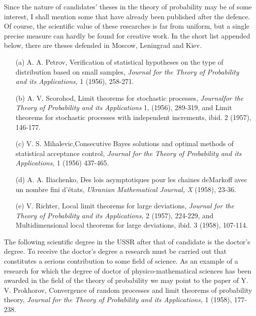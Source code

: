 Since the nature of candidates' theses in the theory of probability
may be of some interest, I shall mention some that have already been
published after the defence. Of course, the scientific value of these
researches is far from uniform, but a single precise measure can
hardly be found for creative work. In the short list appended below,
there are theses defended in Moscow, Leningrad and Kiev. 
\begin{itemize}
\item[(a)] A. A. Petrov, Verification of statistical hypotheses on the
  type of distribution based on small samples, \textit{Journal for the
  Theory of Probability and its Applications,}  1 (1956), 258-271.

\item[(b)] A. V. Scorohod, Limit theorems for stochastic processes,
  \textit{Journal\break for the Theory of Probability and its Applications} 1,
  (1956), 289-319, and Limit theorems for stochastic processes with
  independent increments, ibid. 2 (1957), 146-177.

\item[(c)] V. S. Mihalevic,\pageoriginale Consecutive Bayes solutions
  and optimal methods of statistical acceptance control,
  \textit{Journal for the Theory of Probability and its Applications,}
  1 (1956) 437-465.

\item[(d)] A. A. Iliachenko, Des lois asymptotiques pour les chaines
  de\break Markoff avec un nombre fini d'\'etats, \textit{Ukranian
    Mathematical Journal, X} (1958), 23-36.

\item[(e)] V. Richter, Local limit theorems for large deviations,
  \textit{Journal for the Theory of Probability and its Applications,}
  2 (1957), 224-229, and Multidimensional local theorems for large
  deviations, ibid. 3 (1958), 107-114.
\end{itemize}

The following scientific degree in the USSR after that of candidate is
the doctor's degree. To receive the doctor's degree a research must be
carried out that constitutes a serious contribution to some field of
science. As an example of a research for which the degree of doctor of
physico-mathematical sciences has been awarded in the field of the
theory of probability we may point to the paper of Y. V. Prokhorov,
Convergence of random processes and limit theorems of probability
theory, \textit{Journal for the Theory of Probability and its
  Applications,} 1 (1958), 177-238.



